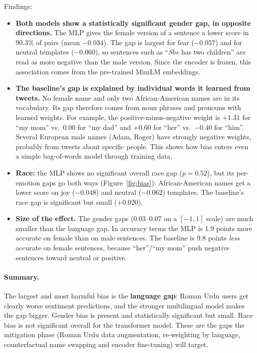 \documentclass[11pt,a4paper]{article}
\begin{document}
\noindent Findings:
\begin{itemize}
  \item \textbf{Both models show a statistically significant gender gap, in opposite
        directions.} The MLP gives the female version of a sentence a lower score in 90.3\%
        of pairs (mean $-0.034$). The gap is largest for fear ($-0.057$) and for neutral
        templates ($-0.060$), so sentences such as ``\emph{She} has two children'' are read
        as more negative than the male version. Since the encoder is frozen, this
        association comes from the pre-trained MiniLM embeddings.
  \item \textbf{The baseline's gap is explained by individual words it learned from tweets.}
        No female name and only two African-American names are in its vocabulary. Its gap
        therefore comes from noun phrases and pronouns with learned weights. For example, the
        positive-minus-negative weight is $+1.31$ for ``my mom'' vs.\ $0.00$ for ``my dad'' and
        $+0.60$ for ``her'' vs.\ $-0.40$ for ``him''. Several European male names (Adam,
        Roger) have strongly negative weights, probably from tweets about specific people.
        This shows how bias enters even a simple bag-of-words model through training data.
  \item \textbf{Race:} the MLP shows no significant overall race gap ($p = 0.52$), but its
        per-emotion gaps go both ways (Figure~\ref{fig:bias}): African-American names get a
        lower score on joy ($-0.048$) and neutral ($-0.062$) templates. The baseline's race gap
        is significant but small ($+0.020$).
  \item \textbf{Size of the effect.} The gender gaps (0.03--0.07 on a $[-1, 1]$ scale) are much
        smaller than the language gap. In accuracy terms the MLP is 1.9 points more accurate on
        female than on male sentences. The baseline is 9.8 points \emph{less} accurate on female
        sentences, because ``her''/``my mom'' push negative sentences toward neutral or positive.
\end{itemize}

\paragraph{Summary.} The largest and most harmful bias is the \textbf{language gap}: Roman Urdu
users get clearly worse sentiment predictions, and the stronger multilingual model makes the
gap bigger. Gender bias is present and statistically significant but small. Race bias is not
significant overall for the transformer model. These are the gaps the mitigation phase
(Roman Urdu data augmentation, re-weighting by language, counterfactual name swapping and
encoder fine-tuning) will target.
\end{document}
